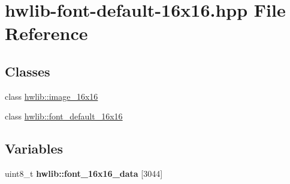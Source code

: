 \hypertarget{hwlib-font-default-16x16_8hpp}{}\section{hwlib-\/font-\/default-\/16x16.hpp File Reference}
\label{hwlib-font-default-16x16_8hpp}
\subsection*{Classes}
\begin{DoxyCompactItemize}
\item 
class \hyperlink{classhwlib_1_1image__16x16}{hwlib\+::image\+\_\+16x16}
\item 
class \hyperlink{classhwlib_1_1font__default__16x16}{hwlib\+::font\+\_\+default\+\_\+16x16}
\end{DoxyCompactItemize}
\subsection*{Variables}
\begin{DoxyCompactItemize}
\item 
uint8\+\_\+t {\bfseries hwlib\+::font\+\_\+16x16\+\_\+data} \mbox{[}3044\mbox{]}\hypertarget{hwlib-font-default-16x16_8hpp_a530344dc6f74ae31c0338b1202303cd6}{}\label{hwlib-font-default-16x16_8hpp_a530344dc6f74ae31c0338b1202303cd6}

\end{DoxyCompactItemize}
